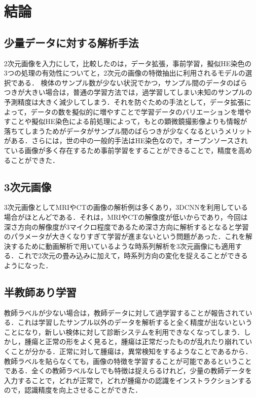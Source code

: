 \chapter{結論}

\section{少量データに対する解析手法}

2次元画像を入力にして，比較したのは，データ拡張，事前学習，擬似HE染色の3つの処理の有効性についてと，2次元の画像の特徴抽出に利用されるモデルの選択である．
検体のサンプル数が少ない状況でかつ，サンプル間のデータのばらつきが大きい場合は，普通の学習方法では，過学習してしまい未知のサンプルの予測精度は大きく減少してしまう．それを防ぐための手法として，データ拡張によって，データの数を擬似的に増やすことで学習データのバリエーションを増やすことや擬似HE染色による前処理によって，もとの顕微鏡撮影像よりも情報が落ちてしまうためがデータがサンプル間のばらつきが少なくなるというメリットがある．さらには，世の中の一般的手法はHE染色なので，オープンソースされている画像が多く存在するため事前学習をすることができることで，精度を高めることができた．

\section{3次元画像}
3次元画像としてMRIやCTの画像の解析例は多くあり，3DCNNを利用している場合がほとんどである．それは，MRIやCTの解像度が低いからであり，今回は深さ方向の解像度が3マイクロ程度であるため深さ方向に解析するとなると学習のパラメータが大きくなりすぎて学習が進まないという問題があった．これを解決するために動画解析で用いているような時系列解析を3次元画像にも適用する．これで2次元の畳み込みに加えて，時系列方向の変化を捉えることができるようになった．

\section{半教師あり学習}
教師ラベルが少ない場合は，教師データに対して過学習することが報告されている．これは学習したサンプル以外のデータを解析すると全く精度が出ないということになり，新しい検体に対して診断システムを利用できなくなってしまう．しかし，腫瘍と正常の形をよく見ると，腫瘍は正常だったものが乱れたり崩れていくことが分かる．正常に対して腫瘍は，異常検知をするようなことであるから．教師ラベルを貼らなくても，画像の特徴を学習することが可能であるということである．全くの教師ラベルなしでも特徴は捉えらるけれど，少量の教師データを入力することで，どれが正常で，どれが腫瘍かの認識をインストラクションするので，認識精度を向上させることができた．

